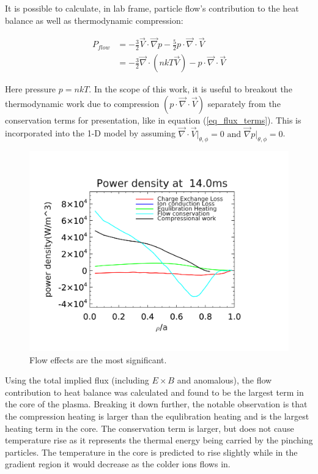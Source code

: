 \documentclass[aip, pop, preprint]{revtex4-1}
\begin{document}
It is possible to calculate, in lab frame, particle flow's contribution to the
heat balance as well as thermodynamic compression:

\begin{align}
P_{flow} & = -\frac{3}{2}\vec{V}\cdot\vec{\nabla}p - \frac{5}{2}p\cdot\vec{\nabla}\cdot\vec{V}\\
& = -\frac{3}{2}\vec{\nabla}\cdot(nkT\vec{V}) - p\cdot\vec{\nabla}\cdot\vec{V}\label{eq_flux_terms}
\end{align} 

Here pressure $ p = nkT $. In the scope of this work, it is useful to breakout
the thermodynamic work due to compression $  ( p\cdot\vec{\nabla}\cdot\vec{V} )
$ separately from the conservation terms for presentation, like in equation
(\ref{eq_flux_terms}). This is incorporated into the 1-D model by assuming $
\vec{\nabla}\cdot\vec{V}\vert_{\theta, \phi} = 0 \text{ and }
\vec{\nabla}p\vert_{\theta, \phi} = 0 $.


\begin{figure}
	\centering
	\includegraphics[width=1.\columnwidth]{./plots/dedt_june18-1.png}
	\caption{Flow effects are the most significant.\label{fig:dedt_plot}}
\end{figure}

Using the total implied flux (including $ E \times B $ and anomalous), the flow
contribution to heat balance was calculated and found to be the largest term in
the core of the plasma. Breaking it down further, the notable observation is
that the compression heating is larger than the equlibration heating and is the
largest heating term in the core. The conservation term is larger, but does not
cause temperature rise as it represents the thermal energy being carried by the
pinching particles. The temperature in the core is predicted to rise slightly
while in the gradient region it would decrease as the colder ions flows in.
\end{document}
